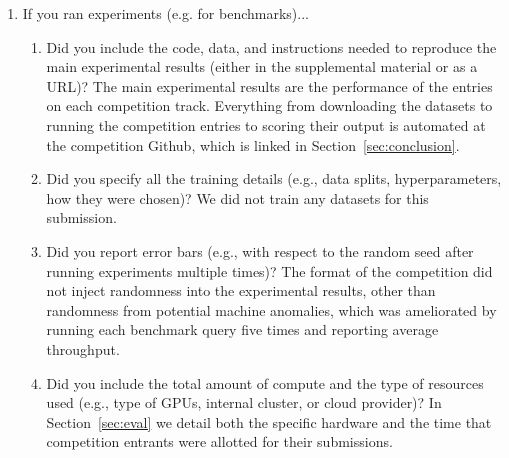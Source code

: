 \begin{enumerate}
\item If you ran experiments (e.g. for benchmarks)...
\begin{enumerate}
  \item Did you include the code, data, and instructions needed to reproduce the main experimental results (either in the supplemental material or as a URL)?
    \answerYes{} The main experimental results are the performance of the entries on each competition track. Everything from downloading the datasets to running the competition entries to scoring their output is automated at the competition Github, which is linked in Section~\ref{sec:conclusion}.
  \item Did you specify all the training details (e.g., data splits, hyperparameters, how they were chosen)?
    \answerNA{} We did not train any datasets for this submission.
	\item Did you report error bars (e.g., with respect to the random seed after running experiments multiple times)?
    \answerNA{} The format of the competition did not inject randomness into the experimental results, other than randomness from potential machine anomalies, which was ameliorated by running each benchmark query five times and reporting average throughput.
	\item Did you include the total amount of compute and the type of resources used (e.g., type of GPUs, internal cluster, or cloud provider)?
    \answerYes{} In Section~\ref{sec:eval} we detail both the specific hardware and the time that competition entrants were allotted for their submissions.
\end{enumerate}


\end{enumerate}
